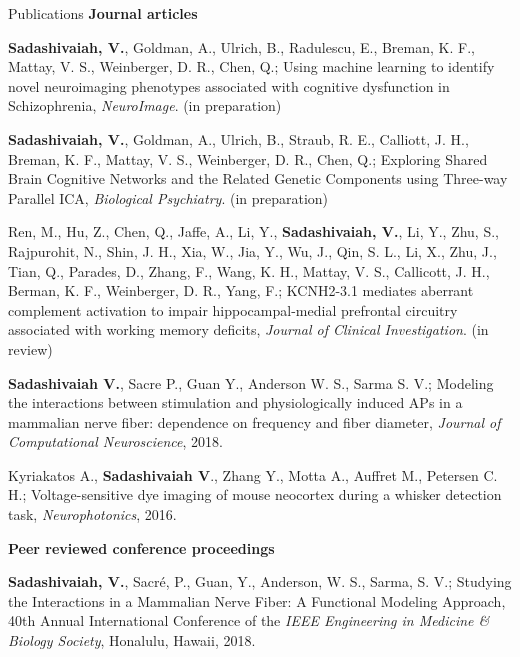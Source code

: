 \documentclass{resume}
\begin{document}
\vspace{1em} 

\begin{rSection}{Publications}
\textbf{Journal articles}
\begin{publications}
\item \textbf{Sadashivaiah, V.}, Goldman, A., Ulrich, B., Radulescu, E., Breman, K. F., Mattay, V. S., Weinberger, D. R., Chen, Q.; Using machine learning to identify novel neuroimaging phenotypes associated with cognitive dysfunction in Schizophrenia, \textit{NeuroImage}. (in preparation)
 
\item \textbf{Sadashivaiah, V.}, Goldman, A., Ulrich, B., Straub, R. E., Calliott, J. H., Breman, K. F., Mattay, V. S., Weinberger, D. R., Chen, Q.; Exploring Shared Brain Cognitive Networks and the Related Genetic Components using Three-way Parallel ICA, \textit{Biological Psychiatry}. (in preparation) 

\item Ren, M., Hu, Z., Chen, Q., Jaffe, A., Li, Y., \textbf{Sadashivaiah, V.}, Li, Y., Zhu, S., Rajpurohit, N., Shin, J. H., Xia, W., Jia, Y., Wu, J., Qin, S. L., Li, X., Zhu, J., Tian, Q., Parades, D., Zhang, F., Wang, K. H., Mattay, V. S., Callicott, J. H., Berman, K. F., Weinberger, D. R., Yang, F.; KCNH2-3.1 mediates aberrant complement activation to impair hippocampal-medial prefrontal circuitry associated with working memory deficits, \textit{Journal of Clinical Investigation}. (in review)

\item \textbf{Sadashivaiah V.}, Sacre P., Guan Y., Anderson W. S., Sarma S. V.; Modeling the interactions between stimulation and physiologically induced APs in a mammalian nerve fiber: dependence on frequency and fiber diameter, \textit{Journal of Computational Neuroscience}, 2018.

\item Kyriakatos A., \textbf{Sadashivaiah V}., Zhang Y., Motta A., Auffret M., Petersen C. H.; Voltage-sensitive dye imaging of mouse neocortex during a whisker detection task, \textit{Neurophotonics}, 2016.\\

\end{publications}

\textbf{Peer reviewed conference proceedings}
\begin{conferences}

\item \textbf{Sadashivaiah, V.}, Sacré, P., Guan, Y., Anderson, W. S., Sarma, S. V.; Studying the Interactions in a Mammalian Nerve Fiber: A Functional Modeling Approach, 40th Annual International Conference of the \textit{IEEE Engineering in Medicine \& Biology Society}, Honalulu, Hawaii, 2018.


\end{conferences}
\end{rSection}
\end{document}

